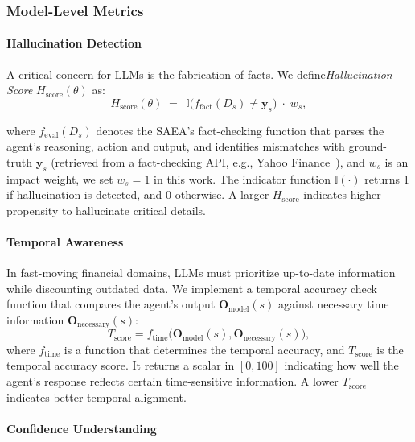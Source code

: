 \subsubsection{Model-Level Metrics}
\label{sec:model-level-metrics}

\paragraph{Hallucination Detection}

A critical concern for LLMs is the fabrication of facts. We define\emph{Hallucination Score} $H_{\text{score}}(\theta)$ as:
\begin{equation}
H_{\text{score}}(\theta) \;=\; 
\,\mathbb{I}\bigl(f_{\text{fact}}(D_s) \neq \mathbf{y}_s\bigr)\;\cdot\; w_s,
\end{equation}

where $f_{\text{eval}}(D_s)$ denotes the SAEA's fact-checking function that parses the agent's reasoning, action and output,  and identifies mismatches with ground-truth $\mathbf{y}_s$ (retrieved from a fact-checking API, e.g., Yahoo Finance~\citep{yahoofinance}), and $w_s$ is an impact weight, we set $w_s=1$ in this work. The indicator function $\mathbb{I}(\cdot)$ returns 1 if hallucination is detected, and 0 otherwise. A larger $H_{\text{score}}$ indicates higher propensity to hallucinate critical details. 


\paragraph{Temporal Awareness}
In fast-moving financial domains, LLMs must prioritize up-to-date information while discounting outdated data. We implement a temporal accuracy check function that compares the agent's output $\mathbf{O}_{\text{model}}(s)$ against necessary time information $\mathbf{O}_{\text{necessary}}(s)$:
\begin{equation}\label{eq:temporal-check}
T_\text{score} = f_\text{time} \bigl(\mathbf{O}_{\text{model}}(s), \mathbf{O}_{\text{necessary}}(s)\bigr),
\end{equation}
where $f_{\text{time}}$ is a function that determines the temporal accuracy, and $T_\text{score}$ is the temporal accuracy score. It returns a scalar in $[0,100]$ indicating how well the agent's response reflects certain time-sensitive information. A lower $T_\text{score}$ indicates better temporal alignment.




\paragraph{Confidence Understanding}

